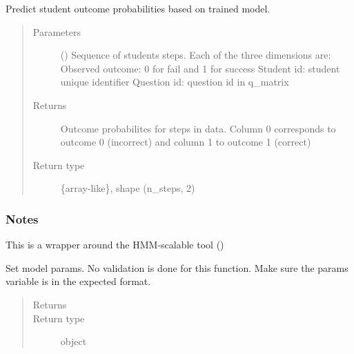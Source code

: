 \documentclass[letterpaper,10pt,english]{sphinxmanual}
\begin{document}
\begin{fulllineitems}
\begin{fulllineitems}
\label{\detokenize{bkt:bkt.BKT.predict_proba}}
Predict student outcome probabilities based on trained model.
\begin{quote}\begin{description}
\item[{Parameters}] \leavevmode
{} (\sphinxstyleliteralemphasis{\sphinxupquote{, }}\sphinxstyleliteralemphasis{\sphinxupquote{ (}}\sphinxstyleliteralemphasis{\sphinxupquote{, }}\sphinxstyleliteralemphasis{\sphinxupquote{)}}) \textendash{} Sequence of students steps. Each of the three dimensions are:
Observed outcome: 0 for fail and 1 for success
Student id: student unique identifier
Question id: question id in q\_matrix

\item[{Returns}] \leavevmode
{} \textendash{} Outcome probabilites for steps in data. Column 0 corresponds to outcome 0 (incorrect)
and column 1 to outcome 1 (correct)

\item[{Return type}] \leavevmode
\{array-like\}, shape (n\_steps, 2)

\end{description}\end{quote}
\subsubsection*{Notes}

This is a wrapper around the HMM-scalable tool ()

\end{fulllineitems}


\begin{fulllineitems}
\label{\detokenize{bkt:bkt.BKT.set_params}}
Set model params. No validation is done for this function.
Make sure the params variable is in the expected format.
\begin{quote}\begin{description}
\item[{Returns}] \leavevmode
{}

\item[{Return type}] \leavevmode
object

\end{description}\end{quote}

\end{fulllineitems}


\end{fulllineitems}
\end{document}
